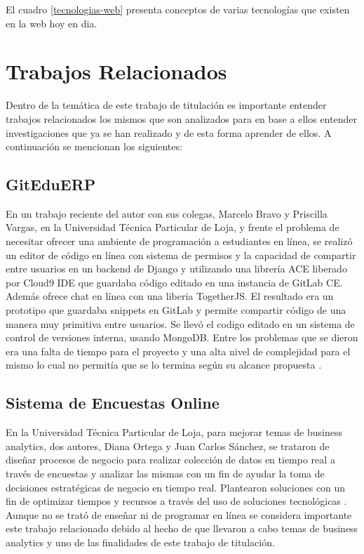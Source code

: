 El cuadro \ref{tecnologias-web} presenta conceptos de varias tecnologías que existen en la web hoy en dia.

\pagebreak

\section{Trabajos Relacionados}
Dentro de la temática de este trabajo de titulación es importante entender trabajos relacionados los mismos que son analizados para en base a ellos entender investigaciones que ya se han realizado y de esta forma aprender de ellos. A continuación se mencionan los siguientes:

  
\subsection{GitEduERP}
En un trabajo reciente del autor con sus colegas, Marcelo Bravo y Priscilla Vargas, en la Universidad Técnica Particular de Loja, y frente el problema de necesitar ofrecer una ambiente de programación a estudiantes en línea, se realizó un editor de código en línea con sistema de permisos y la capacidad de compartir entre usuarios en un backend de Django y utilizando una librería ACE liberado por Cloud9 IDE que guardaba código editado en una instancia de GitLab CE. Además ofrece chat en línea con una liberia TogetherJS. El resultado era un prototipo que guardaba snippets en GitLab y permite compartir código de una manera muy primitiva entre usuarios. Se llevó el codigo editado en un sistema de control de versiones interna, usando MongoDB. Entre los problemas que se dieron era una falta de tiempo para el proyecto y una alta nivel de complejidad para el mismo lo cual no permitía que se lo termina según su alcance propuesta \citep{UTPL-GitEduERP}.
  

 
\subsection{Sistema de Encuestas Online}
En la Universidad Técnica Particular de Loja, para mejorar temas de business analytics, dos autores, Diana Ortega y Juan Carlos Sánchez, se trataron de diseñar procesos de negocio para realizar colección de datos en tiempo real a través de encuestas y analizar las mismas con un fin de ayudar la toma de decisiones estratégicas de negocio en tiempo real. Plantearon soluciones con un fin de optimizar tiempos y recursos a través del uso de soluciones tecnológicas \citep{UTPL-Thesis-Encuestas-Online}. Aunque no se trató de enseñar ni de programar en línea se considera importante este trabajo relacionado debido al hecho de que llevaron a cabo temas de business analytics y uno de las finalidades de este trabajo de titulación.
 

